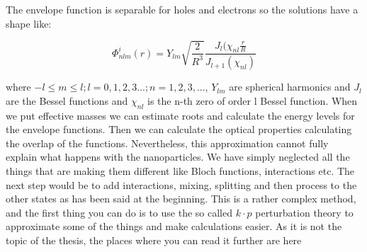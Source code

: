 The envelope function is separable for holes and electrons so the solutions have a shape like:

\begin{equation}
\Phi _{nlm} ^i(r) = Y_{lm} \sqrt{\frac{2}{R^3}} \frac{J_l(\chi _{nl}\frac{r}{R}}{J_{l+1}(\chi _{nl})}
\end{equation}

where $-l \leq m \leq l; l = 0,1,2,3...; n = 1,2,3,...$, $Y_{lm}$ are spherical harmonics and $J_l$ are the Bessel functions and $\chi _{nl}$ is the n-th zero of order l Bessel function. When we put effective masses we can estimate roots and calculate the energy levels for the envelope functions. Then we can calculate the optical properties calculating the overlap of the functions. Nevertheless, this approximation cannot fully explain what happens with the nanoparticles. We have simply neglected all the things that are making them different like Bloch functions, interactions etc. The next step would be to add interactions, mixing, splitting and then process to the other states as has been said at the beginning. This is a rather complex method, and the first thing you can do is to use the so called $k\cdot p$ perturbation theory to approximate some of the things and make calculations easier. As it is not the topic of the thesis, the places where you can read it further are here \cite{Klimov} \cite{ulrike} \cite{fox} \cite{dotsy}